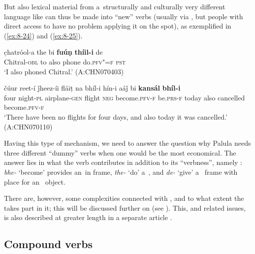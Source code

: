 But also lexical material from a~structurally and culturally very different language like \iliEnglish can thus be made into ``new'' verbs (usually via \iliUrdu, but people with direct access to \iliEnglish have no problem applying it on the spot), as exemplified in (\ref{ex:8-24}) and (\ref{ex:8-25}).

\begin{exe}
\ex
\label{ex:8-24}
\gll c̣hatróol-a the bi \textbf{fuúṇ} \textbf{thíil-i} de\\
Chitral-\textsc{obl} to also phone do.\textsc{pfv"=f} \textsc{pst}\\
\glt `I also phoned Chitral.' (A:CHN070403)
\end{exe}
\begin{exe}
\ex
\label{ex:8-25}
\gll čúur reet-í ǰheez-íi fláiṭ na bhíl-i  hín-i aáǰ bi \textbf{kansál} \textbf{bhíl-i}\\
four night-\textsc{pl} airplane-\textsc{gen} flight \textsc{neg} become.\textsc{pfv-f}  be.\textsc{prs-f} today also cancelled become.\textsc{pfv-f}\\
\glt `There have been no flights for four days, and also today it was cancelled.' (A:CHN070110)
\end{exe}

Having this type of mechanism, we need to answer the question why Palula needs three different ``dummy'' verbs when one would be the most economical. The answer lies in what the verb contributes in addition to its ``verbness'', namely : \textit{bhe-} `become' provides an~in frame, \textit{the-} `do' a~, and \textit{de-} `give' a~ frame with place for an~ object. 


There are, however, some complexities connected with , and to what extent the  takes part in it; this will be discussed further on (see ). This, and related issues, is also described at greater length in a separate article \citep{liljegren2010}.


\subsection{Compound verbs}
\label{subsec:8-6-2}

